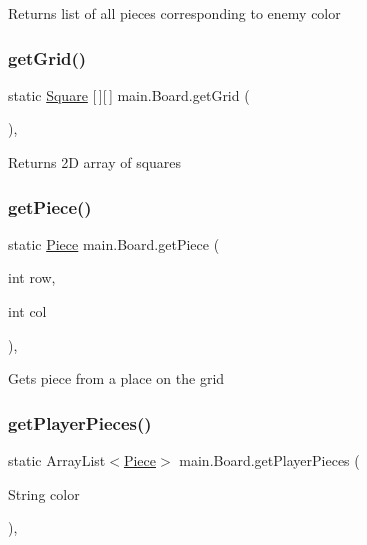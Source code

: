Returns list of all pieces corresponding to enemy color \mbox{\label{classmain_1_1_board_ad9bdfe96594f8267aca15cafe03904ae}} 
\subsubsection{\texorpdfstring{get\+Grid()}{getGrid()}}
{\footnotesize\ttfamily static \hyperlink{classmain_1_1_square}{Square} \mbox{[}$\,$\mbox{]}\mbox{[}$\,$\mbox{]} main.\+Board.\+get\+Grid (\begin{DoxyParamCaption}{ }\end{DoxyParamCaption})\hspace{0.3cm}{\ttfamily [inline]}, {\ttfamily [static]}}

Returns 2D array of squares \mbox{\label{classmain_1_1_board_ab9261be6958e2532a50ae8203ad134d0}} 
\subsubsection{\texorpdfstring{get\+Piece()}{getPiece()}}
{\footnotesize\ttfamily static \hyperlink{classmain_1_1pieces_1_1_piece}{Piece} main.\+Board.\+get\+Piece (\begin{DoxyParamCaption}\item[{int}]{row,  }\item[{int}]{col }\end{DoxyParamCaption})\hspace{0.3cm}{\ttfamily [inline]}, {\ttfamily [static]}}

Gets piece from a place on the grid \mbox{\label{classmain_1_1_board_a95214b4080e976b2db615c57fb9dbfaa}} 
\subsubsection{\texorpdfstring{get\+Player\+Pieces()}{getPlayerPieces()}}
{\footnotesize\ttfamily static Array\+List$<$\hyperlink{classmain_1_1pieces_1_1_piece}{Piece}$>$ main.\+Board.\+get\+Player\+Pieces (\begin{DoxyParamCaption}\item[{String}]{color }\end{DoxyParamCaption})\hspace{0.3cm}{\ttfamily [inline]}, {\ttfamily [static]}}

